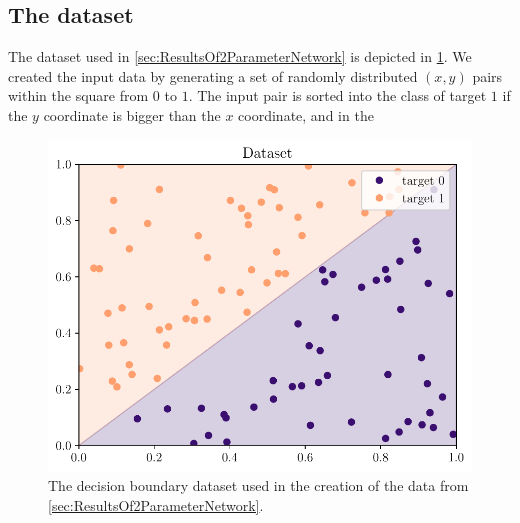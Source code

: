 \subsection{The dataset}
The dataset used in \cref{sec:ResultsOf2ParameterNetwork} is depicted in \cref{fig:DB dataset}. We created the input data by generating a set of randomly distributed $(x,y)$ pairs within the square from $0$ to $1$. The input pair is sorted into the class of target $1$ if the $y$ coordinate is bigger than the $x$ coordinate, and in the 
\begin{figure}
	\centering
	\includegraphics{Experiment2/plots/Dataset.pdf}
	\caption{The decision boundary dataset used in the creation of the data from \cref{sec:ResultsOf2ParameterNetwork}.}
	\label{fig:DB dataset}
\end{figure}

